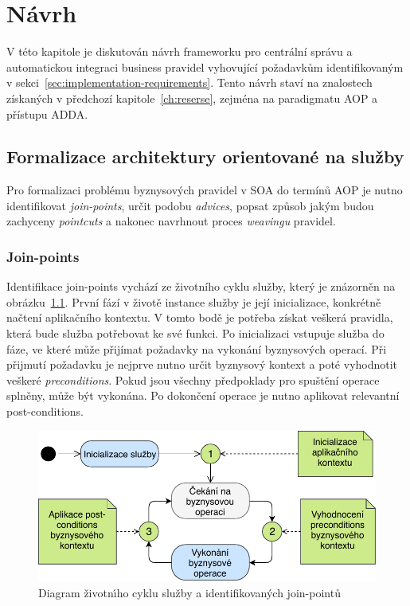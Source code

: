 
\chapter{Návrh}\label{ch:navrh}

V této kapitole je diskutován návrh frameworku pro centrální správu
a automatickou integraci business pravidel vyhovující požadavkům identifikovaným
v sekci~\ref{sec:implementation-requirements}. Tento návrh staví na znalostech získaných
v předchozí kapitole~\ref{ch:reserse}, zejména na paradigmatu \gls{AOP} a přístupu \gls{ADDA}.

\section{Formalizace architektury orientované na služby}

Pro formalizaci problému byznysových pravidel v \gls{SOA} do termínů \gls{AOP} je nutno
identifikovat \textit{join-points}, určit podobu \textit{advices}, popsat způsob jakým budou
zachyceny \textit{pointcuts} a nakonec navrhnout proces \textit{weavingu} pravidel.

\subsection{Join-points}

Identifikace join-points vychází ze životního cyklu služby, který je znázorněn
na obrázku~\ref{fig:join-points}. První fází v životě instance služby je její inicializace,
konkrétně načtení aplikačního kontextu. V tomto bodě je potřeba získat veškerá pravidla, která
bude služba potřebovat ke své funkci.
Po inicializaci vstupuje služba do fáze, ve které může přijímat požadavky
na vykonání byznysových operací. Při přijmutí požadavku je nejprve nutno určit
byznysový kontext a poté vyhodnotit veškeré \textit{preconditions}. Pokud jsou všechny předpoklady
pro spuštění operace splněny, může být vykonána. Po dokončení operace je nutno aplikovat relevantní
post-conditions.

\begin{figure}
    \centering
    \includegraphics[keepaspectratio=true, width=0.6\linewidth]{figures/join-points.pdf}
    \caption{Diagram životn\'{\i}ho cyklu služby a identifikovan\'ych join-pointů}
    \label{fig:join-points}
\end{figure}

